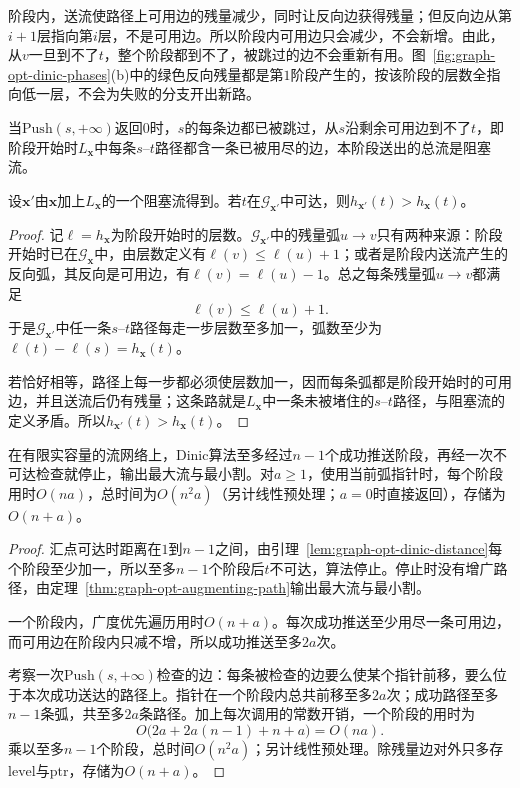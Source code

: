 阶段内，送流使路径上可用边的残量减少，同时让反向边获得残量；但反向边从第$i+1$层指向第$i$层，不是可用边。所以阶段内可用边只会减少，不会新增。由此，从$v$一旦到不了$t$，整个阶段都到不了，被跳过的边不会重新有用。图~\ref{fig:graph-opt-dinic-phases}(b)中的绿色反向残量都是第$1$阶段产生的，按该阶段的层数全指向低一层，不会为失败的分支开出新路。

当$\mathrm{Push}(s,+\infty)$返回$0$时，$s$的每条边都已被跳过，从$s$沿剩余可用边到不了$t$，即阶段开始时$L_{\bm x}$中每条$s$--$t$路径都含一条已被用尽的边，本阶段送出的总流是阻塞流。

\begin{lemma}[阶段距离严格增加]
\label{lem:graph-opt-dinic-distance}
设$\bm x'$由$\bm x$加上$L_{\bm x}$的一个阻塞流得到。若$t$在$\mathcal G_{\bm x'}$中可达，则$h_{\bm x'}(t)>h_{\bm x}(t)$。
\end{lemma}

\begin{proof}
记$\ell=h_{\bm x}$为阶段开始时的层数。$\mathcal G_{\bm x'}$中的残量弧$u\to v$只有两种来源：阶段开始时已在$\mathcal G_{\bm x}$中，由层数定义有$\ell(v)\leq\ell(u)+1$；或者是阶段内送流产生的反向弧，其反向是可用边，有$\ell(v)=\ell(u)-1$。总之每条残量弧$u\to v$都满足
\[
  \ell(v)\leq\ell(u)+1.
\]
于是$\mathcal G_{\bm x'}$中任一条$s$--$t$路径每走一步层数至多加一，弧数至少为$\ell(t)-\ell(s)=h_{\bm x}(t)$。

若恰好相等，路径上每一步都必须使层数加一，因而每条弧都是阶段开始时的可用边，并且送流后仍有残量；这条路就是$L_{\bm x}$中一条未被堵住的$s$--$t$路径，与阻塞流的定义矛盾。所以$h_{\bm x'}(t)>h_{\bm x}(t)$。
\end{proof}

\begin{theorem}[Dinic算法的正确性与开销]
\label{thm:graph-opt-dinic}
在有限实容量的流网络上，Dinic算法至多经过$n-1$个成功推送阶段，再经一次不可达检查就停止，输出最大流与最小割。对$a\geq1$，使用当前弧指针时，每个阶段用时$O(na)$，总时间为$O(n^2a)$（另计线性预处理；$a=0$时直接返回），存储为$O(n+a)$。
\end{theorem}

\begin{proof}
汇点可达时距离在$1$到$n-1$之间，由引理~\ref{lem:graph-opt-dinic-distance}每个阶段至少加一，所以至多$n-1$个阶段后$t$不可达，算法停止。停止时没有增广路径，由定理~\ref{thm:graph-opt-augmenting-path}输出最大流与最小割。

一个阶段内，广度优先遍历用时$O(n+a)$。每次成功推送至少用尽一条可用边，而可用边在阶段内只减不增，所以成功推送至多$2a$次。

考察一次$\mathrm{Push}(s,+\infty)$检查的边：每条被检查的边要么使某个指针前移，要么位于本次成功送达的路径上。指针在一个阶段内总共前移至多$2a$次；成功路径至多$n-1$条弧，共至多$2a$条路径。加上每次调用的常数开销，一个阶段的用时为
\[
  O\bigl(2a+2a(n-1)+n+a\bigr)=O(na).
\]
乘以至多$n-1$个阶段，总时间$O(n^2a)$；另计线性预处理。除残量边对外只多存$\mathrm{level}$与$\mathrm{ptr}$，存储为$O(n+a)$。
\end{proof}

